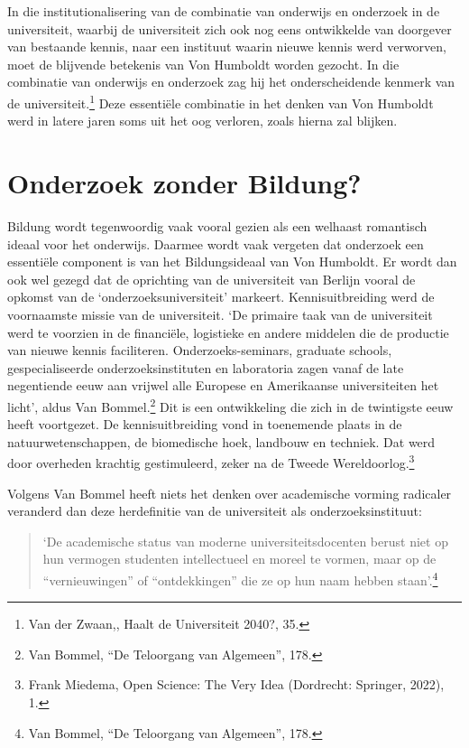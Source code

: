 \documentclass{jote-book}
\begin{document}
	In die institutionalisering van de combinatie van onderwijs en onderzoek in de universiteit, waarbij de universiteit zich ook nog eens ontwikkelde van doorgever van bestaande kennis, naar een instituut waarin nieuwe kennis werd verworven, moet de blijvende betekenis van Von Humboldt worden gezocht. In die combinatie van onderwijs en onderzoek zag hij het onderscheidende kenmerk van de universiteit.\footnote{Van der Zwaan,, Haalt de Universiteit 2040?, 35.} Deze essentiële combinatie in het denken van Von Humboldt werd in latere jaren soms uit het oog verloren, zoals hierna zal blijken.



	\section{Onderzoek zonder Bildung?}



	Bildung wordt tegenwoordig vaak vooral gezien als een welhaast romantisch ideaal voor het onderwijs. Daarmee wordt vaak vergeten dat onderzoek een essentiële component is van het Bildungsideaal van Von Humboldt. Er wordt dan ook wel gezegd dat de oprichting van de universiteit van Berlijn vooral de opkomst van de ‘onderzoeksuniversiteit' markeert. Kennisuitbreiding werd de voornaamste missie van de universiteit. ‘De primaire taak van de universiteit werd te voorzien in de financiële, logistieke en andere middelen die de productie van nieuwe kennis faciliteren. Onderzoeks-seminars, graduate schools, gespecialiseerde onderzoeksinstituten en laboratoria zagen vanaf de late negentiende eeuw aan vrijwel alle Europese en Amerikaanse universiteiten het licht', aldus Van Bommel.\footnote{Van Bommel, “De Teloorgang van Algemeen”, 178.} Dit is een ontwikkeling die zich in de twintigste eeuw heeft voortgezet. De kennisuitbreiding vond in toenemende plaats in de natuurwetenschappen, de biomedische hoek, landbouw en techniek. Dat werd door overheden krachtig gestimuleerd, zeker na de Tweede Wereldoorlog.\footnote{Frank Miedema, Open Science: The Very Idea (Dordrecht: Springer, 2022), 1.}



	Volgens Van Bommel heeft niets het denken over academische vorming radicaler veranderd dan deze herdefinitie van de universiteit als onderzoeksinstituut:

	\begin{quote}
		\itshape

		‘De academische status van moderne universiteitsdocenten berust niet op hun vermogen studenten intellectueel en moreel te vormen, maar op de “vernieuwingen” of “ontdekkingen” die ze op hun naam hebben staan'.\footnote{Van Bommel, “De Teloorgang van Algemeen”, 178.}
	\end{quote}
\end{document}
